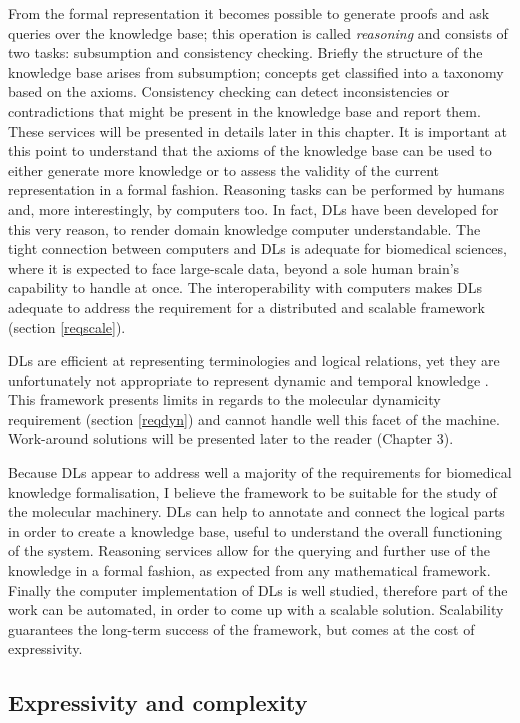 From the formal representation it becomes possible to generate proofs and ask queries over the knowledge base; this operation is called \emph{reasoning} and consists of two tasks: subsumption and consistency checking. Briefly the structure of the knowledge base arises from subsumption; concepts get classified into a taxonomy based on the axioms. Consistency checking can detect inconsistencies or contradictions that might be present in the knowledge base and report them. These services will be presented in details later in this chapter. It is important at this point to understand that the axioms of the knowledge base can be used to either generate more knowledge or to assess the validity of the current representation in a formal fashion. Reasoning tasks can be performed by humans and, more interestingly, by computers too. In fact, DLs have been developed for this very reason, to render domain knowledge computer understandable. The tight connection between computers and DLs is adequate for biomedical sciences, where it is expected to face large-scale data, beyond a sole human brain's capability to handle at once. The interoperability with computers makes DLs adequate to address the requirement for a distributed and scalable framework (section \ref{reqscale}).

DLs are efficient at representing terminologies and logical relations, yet they are unfortunately not appropriate to represent dynamic and temporal knowledge \citep{kim2008temporal}. This framework presents limits in regards to the molecular dynamicity requirement (section \ref{reqdyn}) and cannot handle well this facet of the machine. Work-around solutions will be presented later to the reader (Chapter 3).

Because DLs appear to address well a majority of the requirements for biomedical knowledge formalisation, I believe the framework to be suitable for the study of the molecular machinery. DLs can help to annotate and connect the logical parts in order to create a knowledge base, useful to understand the overall functioning of the system. Reasoning services allow for the querying and further use of the knowledge in a formal fashion, as expected from any mathematical framework. Finally the computer implementation of DLs is well studied, therefore part of the work can be automated, in order to come up with a scalable solution. Scalability guarantees the long-term success of the framework, but comes at the cost of expressivity.

\subsection{Expressivity and complexity}
\label{complexity}


